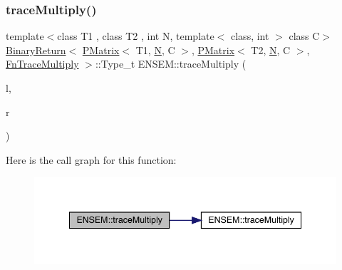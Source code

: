\subsubsection{\texorpdfstring{traceMultiply()}{traceMultiply()}\hspace{0.1cm}{\footnotesize\ttfamily [1/3]}}
{\footnotesize\ttfamily template$<$class T1 , class T2 , int N, template$<$ class, int $>$ class C$>$ \\
\mbox{\hyperlink{structENSEM_1_1BinaryReturn}{Binary\+Return}}$<$ \mbox{\hyperlink{classENSEM_1_1PMatrix}{P\+Matrix}}$<$ T1, \mbox{\hyperlink{adat__devel_2lib_2hadron_2operator__name__util_8cc_a7722c8ecbb62d99aee7ce68b1752f337}{N}}, C $>$, \mbox{\hyperlink{classENSEM_1_1PMatrix}{P\+Matrix}}$<$ T2, \mbox{\hyperlink{adat__devel_2lib_2hadron_2operator__name__util_8cc_a7722c8ecbb62d99aee7ce68b1752f337}{N}}, C $>$, \mbox{\hyperlink{structENSEM_1_1FnTraceMultiply}{Fn\+Trace\+Multiply}} $>$\+::Type\+\_\+t E\+N\+S\+E\+M\+::trace\+Multiply (\begin{DoxyParamCaption}\item[{const \mbox{\hyperlink{classENSEM_1_1PMatrix}{P\+Matrix}}$<$ T1, \mbox{\hyperlink{adat__devel_2lib_2hadron_2operator__name__util_8cc_a7722c8ecbb62d99aee7ce68b1752f337}{N}}, C $>$ \&}]{l,  }\item[{const \mbox{\hyperlink{classENSEM_1_1PMatrix}{P\+Matrix}}$<$ T2, \mbox{\hyperlink{adat__devel_2lib_2hadron_2operator__name__util_8cc_a7722c8ecbb62d99aee7ce68b1752f337}{N}}, C $>$ \&}]{r }\end{DoxyParamCaption})\hspace{0.3cm}{\ttfamily [inline]}}

Here is the call graph for this function\+:\nopagebreak
\begin{figure}[H]
\begin{center}
\leavevmode
\includegraphics[width=342pt]{df/d0a/group__primmatrix_ga91e09af0f8d2d70627950b973f6b41ec_cgraph}
\end{center}
\end{figure}
\mbox{\label{group__primmatrix_gac4a39563bd9c9b587bd894f97f9e3fc4}} 
